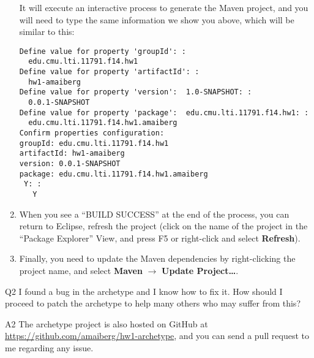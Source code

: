 \begin{qa}
\begin{enumerate}
It will execute an interactive process to generate the Maven project, and you
will need to type the same information we show you above, which will be similar
to this:

\small
\begin{verbatim}
Define value for property 'groupId': : 
  edu.cmu.lti.11791.f14.hw1
Define value for property 'artifactId': : 
  hw1-amaiberg
Define value for property 'version':  1.0-SNAPSHOT: : 
  0.0.1-SNAPSHOT
Define value for property 'package':  edu.cmu.lti.11791.f14.hw1: : 
  edu.cmu.lti.11791.f14.hw1.amaiberg
Confirm properties configuration:
groupId: edu.cmu.lti.11791.f14.hw1
artifactId: hw1-amaiberg
version: 0.0.1-SNAPSHOT
package: edu.cmu.lti.11791.f14.hw1.amaiberg
 Y: : 
   Y
\end{verbatim}
\normalsize

\item When you see a ``BUILD SUCCESS'' at the end of the process, you can return
to Eclipse, refresh the project (click on the name of the project in the
``Package Explorer'' View, and press F5 or right-click and select
\textbf{Refresh}).

\item Finally, you need to update the Maven dependencies by right-clicking the
project name, and select \textbf{Maven} $\rightarrow$ \textbf{Update
Project\ldots}.

\end{enumerate}

\item[Q2] I found a bug in the archetype and I know how to fix it. How should I
proceed to patch the archetype to help many others who may suffer from this? 

\item[A2] The archetype project is also hosted on GitHub at
\url{https://github.com/amaiberg/hw1-archetype}, and you can send a pull request to
me regarding any issue.

\end{qa}
